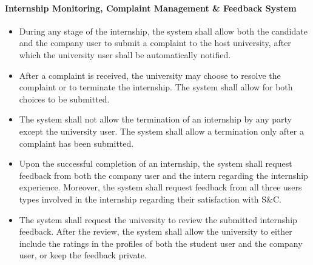 \paragraph{Internship Monitoring, Complaint Management \& Feedback System}
\begin{itemize}[label={[\textbf{FR}]}, align=left, leftmargin=*]
    \item {} During any stage of the internship, the system shall allow both the candidate and the company user to submit a complaint to the host university, after which the university user shall be automatically notified.
    \item {} After a complaint is received, the university may choose to resolve the complaint or to terminate the internship. The system shall allow for both choices to be submitted.
    \item {} The system shall not allow the termination of an internship by any party except the university user. The system shall allow a termination only after a complaint has been submitted.
    \item {} Upon the successful completion of an internship, the system shall request feedback from both the company user and the intern regarding the internship experience. Moreover, the system shall request feedback from all three users types involved in the internship regarding their satisfaction with S\&C.
    \item {} The system shall request the university to review the submitted internship feedback. After the review, the system shall allow the university to either include the ratings in the profiles of both the student user and the company user, or keep the feedback private.
\end{itemize}

